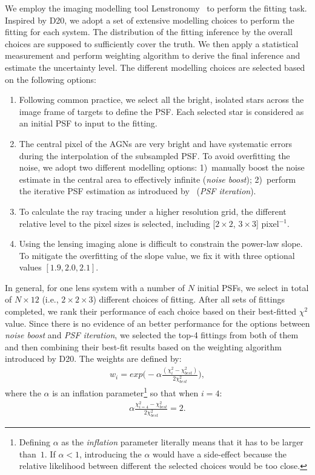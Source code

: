 \documentclass[fleqn,usenatbib]{mnras}
\newcommand{\lenstronomy}{{\sc Lenstronomy}}
\begin{document}
We employ the imaging modelling tool \lenstronomy~\citep{lenstronomy} to perform the fitting task. Inspired by D20, we adopt a set of extensive modelling choices to perform the fitting for each system. The distribution of the fitting inference by the overall choices are supposed to sufficiently cover the truth. We then apply a statistical measurement and perform weighting algorithm to derive the final inference and estimate the uncertainty level. The different modelling choices are selected based on the following options:
\begin{enumerate}
\item Following common practice, we select all the bright, isolated stars across the image frame of targets to define the PSF. Each selected star is considered as an initial PSF to input to the fitting.
\item The central pixel of the AGNs are very bright and have systematic errors during the interpolation of the subsampled PSF. To avoid overfitting the noise, we adopt two different modelling options: 1)~manually boost the noise estimate in the central area to effectively infinite ({\it noise boost}); 2)~perform the iterative PSF estimation as introduced by~\citet{Chen2016, Birrer2019} ({\it PSF iteration}).
\item To calculate the ray tracing under a higher resolution grid, the different relative level to the pixel sizes is selected, including [$2\times2$, $3\times3$] pixel$^{-1}$.
\item Using the lensing imaging alone is difficult to constrain the power-law slope. To mitigate the overfitting of the slope value, we fix it with three optional values $[1.9, 2.0, 2.1]$.
\end{enumerate}

In general, for one lens system with a number of $N$ initial PSFs, we select in total of $N\times12$ (i.e., $2 \times2 \times3$) different choices of fitting. After all sets of fittings completed, we rank their performance of each choice based on their best-fitted $\chi^2$ value. Since there is no evidence of an better performance for the options between {\it noise boost} and {\it PSF iteration}, we selected the top-4 fittings from both of them and then combining their best-fit results based on the weighting algorithm introduced by D20. The weights are defined by:
\begin{eqnarray}
\label{eq:weights}
w_i = exp \big(- \alpha \frac{ (\chi_i ^2 - \chi_{best} ^2 )}{2 \chi_{best} ^2} \big),
\end{eqnarray} 
where the $\alpha$ is an inflation parameter\footnote{Defining $\alpha$ as the {\it inflation} parameter literally means that it has to be larger than~$1$. If $\alpha<1$, introducing the $\alpha$ would have a side-effect because the relative likelihood between different the selected choices would be too close.} so that when $i=4$:
\begin{eqnarray}
\label{eq:alpha}
\alpha \frac{ \chi_{i=4} ^2 - \chi_{best} ^2 }{2 \chi_{best} ^2} = 2.
\end{eqnarray} 
\end{document}
